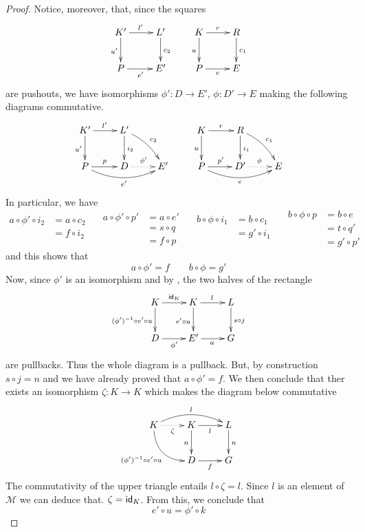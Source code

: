 \begin{proof}
	Notice, moreover, that, since the squares
	\[\xymatrix{K' \ar[d]_{u'} \ar[r]^{l'}& L' \ar[d]^{c_2} & K \ar[r]^{r}\ar[d]_{u} & R \ar[d]^{c_1}\\ P \ar[r]_{e'} & E' & P\ar[r]_e & E}\]
	are pushouts, we have isomorphisms  $\phi'\colon D\to E'$, $\phi\colon D'\to E$ making the following diagrams commutative.
	\[\xymatrix{K' \ar[d]_{u'} \ar[r]^{l'}& L'\ar[d]^{i_2}  \ar@/^.2cm/[dr]^{c_2} & &K \ar[r]^{r}\ar[d]_{u} & R \ar[d]^{i_1} \ar@/^.2cm/[dr]^{c_1}\\ P \ar@/_.4cm/[rr]_{e'}\ar[r]^{p} & D\ar@{.>}[r]^{\phi'} &E'& P\ar@/_.4cm/[rr]_{e}\ar[r]^{p'} & D'\ar@{.>}[r]^{\phi}& E}\]
	In particular, we have
	\[\begin{split}
		a\circ \phi' \circ i_2&=a \circ c_2\\&=f\circ i_2\\&
	\end{split}\quad \begin{split}
	a\circ \phi' \circ p'&=a \circ e'\\&=s\circ q\\&=f\circ p
	\end{split}\quad \begin{split}
	b\circ \phi \circ i_1&=b \circ c_1\\&=g'\circ i_1\\&
	\end{split}\quad \begin{split}
	b\circ \phi \circ p&=b \circ e\\&=t\circ q'\\&=g'\circ p'
	\end{split} \]
	and this shows that 
	\[a\circ \phi'=f \qquad b\circ \phi = g'\]
	Now, since $\phi'$ is an isomorphism and by , the two halves of the rectangle
	\[\xymatrix{K\ar[r]^{\id{K}} \ar[d]_{(\phi')^{-1} \circ e' \circ u}&K\ar[d]_{e'\circ u} \ar[r]^{l} & L \ar[d]^{s\circ j} \\D\ar[r]_{\phi'} & E' \ar[r]_{a}&G}\]
	are pullbacks. Thus the whole diagram is a pullback. But, by construction $s\circ j =n$ and we have already proved that $a\circ \phi'=f$. We then conclude that ther exists an isomorphism $\zeta\colon K\to K$ which makes the diagram below commutative
	\[\xymatrix{K \ar@{.>}[r]_{\zeta}\ar@/^.4cm/[rr]^{l}  \ar@/_.5cm/[dr]_{(\phi')^{-1} \circ e' \circ u}& K \ar[r]_{l} \ar[d]_{n} & L \ar[d]^{n} \\ & D \ar[r]_{f} & G}\]
	The commutativity of the upper triangle entails $l\circ \zeta=l$. Since $l$ is an element of $\mathcal{M}$  we can deduce that. $\zeta=\mathsf{id}_{K}$. From this, we conclude that
	\[e'\circ u = \phi' \circ k\]
	

\end{proof}
